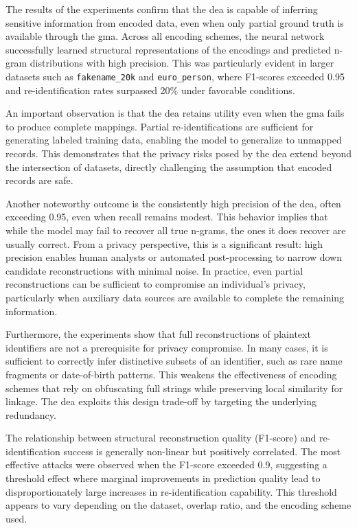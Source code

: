 The results of the experiments confirm that the \ac{dea} is capable of inferring sensitive information from encoded data, even when only partial ground truth is available through the \ac{gma}.
Across all encoding schemes, the neural network successfully learned structural representations of the encodings and predicted n-gram distributions with high precision.
This was particularly evident in larger datasets such as \texttt{fakename\_20k} and \texttt{euro\_person}, where F1-scores exceeded 0.95 and re-identification rates surpassed 20\% under favorable conditions.

An important observation is that the \ac{dea} retains utility even when the \ac{gma} fails to produce complete mappings.
Partial re-identifications are sufficient for generating labeled training data, enabling the model to generalize to unmapped records.
This demonstrates that the privacy risks posed by the \ac{dea} extend beyond the intersection of datasets, directly challenging the assumption that encoded records are safe.

Another noteworthy outcome is the consistently high precision of the \ac{dea}, often exceeding 0.95, even when recall remains modest.
This behavior implies that while the model may fail to recover all true n-grams, the ones it does recover are usually correct.
From a privacy perspective, this is a significant result: high precision enables human analysts or automated post-processing to narrow down candidate reconstructions with minimal noise.
In practice, even partial reconstructions can be sufficient to compromise an individual's privacy, particularly when auxiliary data sources are available to complete the remaining information.

Furthermore, the experiments show that full reconstructions of plaintext identifiers are not a prerequisite for privacy compromise.
In many cases, it is sufficient to correctly infer distinctive subsets of an identifier, such as rare name fragments or date-of-birth patterns.
This weakens the effectiveness of encoding schemes that rely on obfuscating full strings while preserving local similarity for linkage.
The \ac{dea} exploits this design trade-off by targeting the underlying redundancy.

The relationship between structural reconstruction quality (F1-score) and re-identification success is generally non-linear but positively correlated.
The most effective attacks were observed when the F1-score exceeded 0.9, suggesting a threshold effect where marginal improvements in prediction quality lead to disproportionately large increases in re-identification capability.
This threshold appears to vary depending on the dataset, overlap ratio, and the encoding scheme used.

